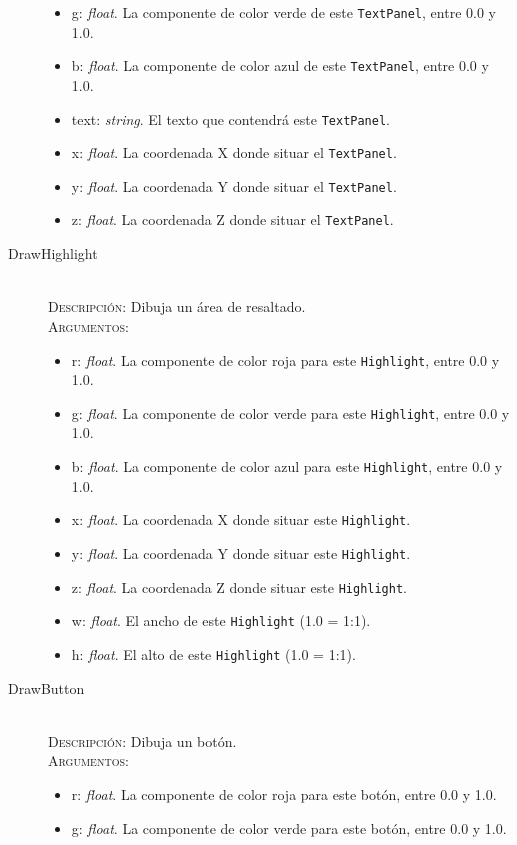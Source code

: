 \begin{description}
\begin{itemize}
  \item g: \textit{float}. La componente de color verde de este \texttt{TextPanel}, entre 0.0 y 1.0.
  \item b: \textit{float}. La componente de color azul de este \texttt{TextPanel}, entre 0.0 y 1.0.
  \item text: \textit{string}. El texto que contendrá este \texttt{TextPanel}.
  \item x: \textit{float}. La coordenada X donde situar el \texttt{TextPanel}.
  \item y: \textit{float}. La coordenada Y donde situar el \texttt{TextPanel}.
  \item z: \textit{float}. La coordenada Z donde situar el \texttt{TextPanel}.
  \end{itemize}
\item[DrawHighlight] \hfill \\
  \textsc{Descripción:} Dibuja un área de resaltado. \\
  \textsc{Argumentos:}
  \begin{itemize}
  \item r: \textit{float}. La componente de color roja para este \texttt{Highlight}, entre 0.0 y 1.0.
  \item g: \textit{float}. La componente de color verde para este \texttt{Highlight}, entre 0.0 y 1.0.
  \item b: \textit{float}. La componente de color azul para este \texttt{Highlight}, entre 0.0 y 1.0.
  \item x: \textit{float}. La coordenada X donde situar este \texttt{Highlight}.
  \item y: \textit{float}. La coordenada Y donde situar este \texttt{Highlight}.
  \item z: \textit{float}. La coordenada Z donde situar este \texttt{Highlight}.
  \item w: \textit{float}. El ancho de este \texttt{Highlight} (1.0 = 1:1).
  \item h: \textit{float}. El alto de este \texttt{Highlight} (1.0 = 1:1).
  \end{itemize}
\item[DrawButton] \hfill \\
  \textsc{Descripción:} Dibuja un botón. \\
  \textsc{Argumentos:}
  \begin{itemize}
  \item r: \textit{float}. La componente de color roja para este botón, entre 0.0 y 1.0.
  \item g: \textit{float}. La componente de color verde para este botón, entre 0.0 y 1.0.

\end{itemize}
\end{description}
